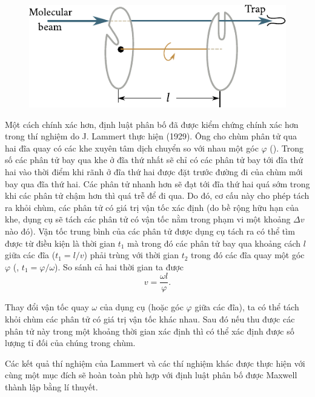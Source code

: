 \begin{figure}[!htb]
	\begin{center}
		\includegraphics[scale=1.0]{figures/ch_11/fig_11_21.pdf}
		\caption[]{}
		\label{fig:11_21}
	\end{center}
	\vspace{-0.7cm}
\end{figure}

Một cách chính xác hơn, định luật phân bố đã được kiểm chứng chính xác hơn trong thí nghiệm do J. Lammert thực hiện (1929). Ông cho chùm phân tử qua hai đĩa quay có các khe xuyên tâm dịch chuyển so với nhau một góc $\varphi$ (). Trong số các phân tử bay qua khe ở đĩa thứ nhất sẽ chỉ có các phân tử bay tới đĩa thứ hai vào thời điểm khi rãnh ở đĩa thứ hai được đặt trước đường đi của chùm mới bay qua đĩa thứ hai. Các phân tử nhanh hơn sẽ đạt tới đĩa thứ hai quá sớm trong khi các phân tử chậm hơn thì quá trễ để đi qua. Do đó, cơ cấu này cho phép tách ra khỏi chùm, các phân tử có giá trị vận tốc xác định (do bề rộng hữu hạn của khe, dụng cụ sẽ tách các phân tử có vận tốc nằm trong phạm vi một khoảng $\Delta v$ nào đó). Vận tốc trung bình của các phân tử được dụng cụ tách ra có thể tìm được từ điều kiện là thời gian $t_1$ mà trong đó các phân tử bay qua khoảng cách $l$ giữa các đĩa ($t_1=l/v$) phải trùng với thời gian $t_2$ trong đó các đĩa quay một góc $\varphi$ (\ie, $t_1=\varphi/\omega$). So sánh cả hai thời gian ta được
\begin{equation*}
	v = \frac{\omega l}{\varphi}.
\end{equation*}

\noindent
Thay đổi vận tốc quay $\omega$ của dụng cụ (hoặc góc $\varphi$ giữa các đĩa), ta có thể tách khỏi chùm các phân tử có giá trị vận tốc khác nhau. Sau đó nếu thu được các phân tử này trong một khoảng thời gian xác định thì có thể xác định được số lượng tỉ đối của chúng trong chùm.

Các kết quả thí nghiệm của Lammert và các thí nghiệm khác được thực hiện với cùng một mục đích sẽ hoàn toàn phù hợp với định luật phân bố được Maxwell thành lập bằng lí thuyết.

